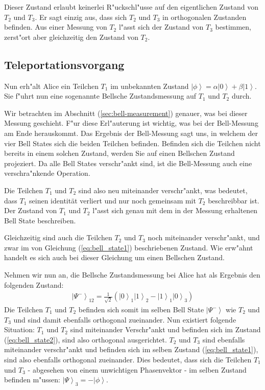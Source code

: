 \begin{refsection}
Dieser Zustand erlaubt keinerlei R"uckschl"usse auf den eigentlichen Zustand von $T_{2}$ und $T_{3}$. Er sagt einzig aus, dass sich $T_{2}$ und $T_{3}$ in orthogonalen Zustanden befinden. Aus einer Messung von $T_{2}$ l"asst sich der Zustand von $T_{3}$ bestimmen, zerst"ort aber gleichzeitig den Zustand von $T_{2}$. 

\subsection{Teleportationsvorgang}
Nun erh"alt Alice ein Teilchen $T_{1}$ im unbekannten Zustand $\left|\phi\right\rangle = \alpha\left|0\right\rangle + \beta\left|1\right\rangle$. Sie f"uhrt nun eine sogenannte Bellsche Zustandsmessung auf $T_{1}$ und $T_{2}$ durch.

Wir betrachten im Abschnitt (\ref{sec:bell-measurement}) genauer, was bei dieser Messung geschieht. F"ur diese Erl"auterung ist wichtig, was bei der Bell-Messung am Ende herauskommt. Das Ergebnis der Bell-Messung sagt uns, in welchem der vier Bell States sich die beiden Teilchen befinden. Befinden sich die Teilchen nicht bereits in einem solchen Zustand, werden Sie auf einen Bellschen Zustand projeziert. Da alle Bell States verschr"ankt sind, ist die Bell-Messung auch eine verschra"nkende Operation.

Die Teilchen $T_{1}$ und $T_{2}$ sind also neu miteinander verschr"ankt, was bedeutet, dass $T_{1}$ seinen identität verliert und nur noch gemeinsam mit $T_{2}$ beschreibbar ist. Der Zustand von $T_{1}$ und $T_{2}$ l"asst sich genau mit dem in der Messung erhaltenen Bell State beschreiben. 

Gleichzeitig sind auch die Teilchen $T_{2}$ und $T_{3}$ noch miteinander verschr"ankt, und zwar im von Gleichung (\ref{eq:bell_state1}) beschriebenen Zustand. Wie erw"ahnt handelt es sich auch bei dieser Gleichung um einen Bellschen Zustand.

Nehmen wir nun an, die Bellsche Zustandsmessung bei Alice hat als Ergebnis den folgenden Zustand:
\begin{align}\label{eq:bell_state2}
\left|\Psi^{-}\right\rangle_{12} = \frac{1}{\sqrt{2}} ( \left|0\right\rangle_{1}\left|1\right\rangle_{2} - \left|1\right\rangle_{1}\left|0\right\rangle_{3} )
\end{align}
Die Teilchen $T_{1}$ und $T_{2}$ befinden sich somit im selben Bell State $\left| \Psi^{-} \right \rangle$ wie $T_{2}$ und $T_{3}$ und sind damit ebenfalls orthogonal zueinander. Nun existiert folgende Situation: $T_{1}$ und $T_{2}$ sind miteinander Verschr"ankt und befinden sich im Zustand (\ref{eq:bell_state2}), sind also orthogonal ausgerichtet. $T_{2}$ und $T_{3}$ sind ebenfalls miteinander verschr"ankt und befinden sich im selben Zustand (\ref{eq:bell_state1}), sind also ebenfalls orthogonal zueinander. Dies bedeutet, dass sich die Teilchen $T_{1}$ und $T_{3}$ - abgesehen von einem unwichtigen Phasenvektor - im selben Zustand befinden m"ussen: $\left| \Psi\right\rangle_{3} = -\left|\phi\right\rangle$.


\end{refsection}
